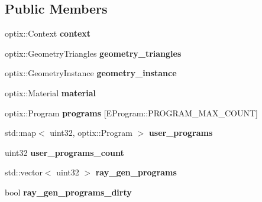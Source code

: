 \subsection*{Public Members}
\begin{DoxyCompactItemize}
\item 
\mbox{\label{struct_r_t_context_impl_ad6f1acb7796f3f168dc793c71b075338}} 
optix\+::\+Context {\bfseries context}
\item 
\mbox{\label{struct_r_t_context_impl_abbac0671d6a75e34fec707845972a98c}} 
optix\+::\+Geometry\+Triangles {\bfseries geometry\+\_\+triangles}
\item 
\mbox{\label{struct_r_t_context_impl_af13e2989a37c7126de324e358e794ab1}} 
optix\+::\+Geometry\+Instance {\bfseries geometry\+\_\+instance}
\item 
\mbox{\label{struct_r_t_context_impl_a1e5cae2cf09162570a12a92374b6b3f4}} 
optix\+::\+Material {\bfseries material}
\item 
\mbox{\label{struct_r_t_context_impl_a9ade08c655fc59346d107e8a9c9b34b5}} 
optix\+::\+Program {\bfseries programs} \mbox{[}E\+Program\+::\+P\+R\+O\+G\+R\+A\+M\+\_\+\+M\+A\+X\+\_\+\+C\+O\+U\+NT\mbox{]}
\item 
\mbox{\label{struct_r_t_context_impl_afce8941d9768bcb55292d6de69c0992d}} 
std\+::map$<$ uint32, optix\+::\+Program $>$ {\bfseries user\+\_\+programs}
\item 
\mbox{\label{struct_r_t_context_impl_a3d90b5c7ecbcb6ccc90b395cb8278d07}} 
uint32 {\bfseries user\+\_\+programs\+\_\+count}
\item 
\mbox{\label{struct_r_t_context_impl_ac605680f16cb08c232fcea63d79b6ebb}} 
std\+::vector$<$ uint32 $>$ {\bfseries ray\+\_\+gen\+\_\+programs}
\item 
\mbox{\label{struct_r_t_context_impl_a2c908b2c01dfdaf087bb1a213ddd0552}} 
bool {\bfseries ray\+\_\+gen\+\_\+programs\+\_\+dirty}
\item 

\end{DoxyCompactItemize}

